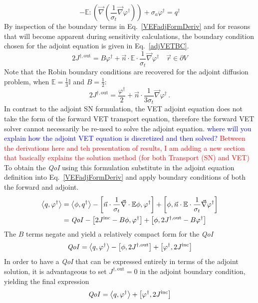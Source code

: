 \documentclass[12pt]{report}
\newcommand{\vr}{\vec{r}}
\newcommand{\bra}{\left\langle}
\newcommand{\ket}{\right\rangle}
\newcommand{\sbra}{\left[}
\newcommand{\sket}{\right]}
\renewcommand{\div}{\vec{\nabla} \cdot}
\newcommand{\grad}{\vec{\nabla}}
\newcommand{\vefadj}{\varphi^\dag}
\newcommand{\bound}{\partial V}
\newcommand{\vn}{\vec{n}}
\newcommand{\Edd}{\mathbb{E}}
\newcommand{\sigt}{\sigma_t}
\newcommand{\siga}{\sigma_a}
\newcommand{\scalSource}{q}
\newcommand{\scalResp}{q^\dag}
\newcommand{\qoi}{{\it QoI}\xspace}
\newcommand{\comment}[2]{\marginpar{\textcolor{#2}{$\star$}}\textcolor{#2}{#1}\newline}
\newcommand{\iwh}[1]{\comment{#1}{red}}
\newcommand{\jcr}[1]{\comment{#1}{blue}}
\newcommand{\iwh}[1]{\phantom{a}}
\newcommand{\jcr}[1]{\phantom{a}}
\begin{document}
\begin{equation}
\label{adjForm}
- \Edd : \left( \grad \left( \frac{1}{\sigt}\grad \vefadj \right) \right) + \siga \vefadj = \scalResp
\end{equation}
By inspection of the boundary terms in Eq.~\eqref{VEFadjFormDeriv} and for reasons that will become apparent during sensitivity calculations, the boundary condition chosen for the adjoint equation is given in Eq.~\eqref{adjVETBC}.
\begin{equation}
\label{adjVETBC}
2J^{\dag,\text{out}} = B \vefadj+ \vn \cdot
\Edd \cdot \frac{1}{\sigma_{t} } \vec{\nabla} \vefadj    \quad \vr \in \bound
\end{equation}
Note that the Robin boundary conditions are recovered for the adjoint diffusion problem, when $\Edd = \tfrac{1}{3} \mathbb{I}$ and $B=\tfrac{1}{2}$:
\[
2 J^{\dag,\text{out}} = \frac{\vefadj}{2} +\vn \cdot \frac{1}{3\sigt} \grad \vefadj \,.
\]
In contrast to the adjoint SN formulation, the VET adjoint equation does not take the form of the  
forward VET transport equation, therefore the forward VET solver 
cannot necessarily be re-used to solve the adjoint equation. 
\jcr{where will you explain how the adjoint VET equation is discretized and then solved?}
\iwh{Between the derivations here and teh presentation of results, I am adding a new section that basically explains the solution method (for both Transport (SN) and VET)}
To obtain the \qoi using this formulation substitute in the adjoint equation definition 
into Eq.~\eqref{VEFadjFormDeriv} and apply boundary conditions of both the forward and adjoint.
\begin{equation}
\label{VETQoIAdjUnpDeriv}
\begin{split}
 \bra \scalSource , \vefadj \ket 
&=   \bra \phi, \scalResp \ket - \sbra \vn \cdot \frac{1}{\sigt}\div \Edd \phi, \vefadj \sket + \sbra \phi, \vn \cdot \Edd \cdot \frac{1}{\sigt} \grad \vefadj \sket \\
&=   \qoi - \sbra 2J^{\text{inc}} - B \phi, \vefadj \sket + \sbra \phi, 2J^{\dag,\text{out}} - B \vefadj \sket \\
\end{split}
\end{equation}
The $B$ terms negate and yield a relatively compact form for the \qoi
\begin{equation}
\label{VETQoIAdj}
\qoi=\bra \scalSource , \vefadj \ket 
- \sbra \phi, 2J^{\dag,\text{out}} \sket  + \sbra \varphi^\dag, 2J^{\text{inc}} \sket
\end{equation}
In order to have a \qoi that can be expressed entirely in terms of the adjoint solution, it is advantageous to 
set $J^{\dag,\text{out}}=0$ in the adjoint boundary condition, yielding the final expression
\begin{equation}
\qoi=\bra \scalSource , \vefadj \ket  + \sbra \vefadj, 2J^{\text{inc}} \sket
\end{equation}
\end{document}
